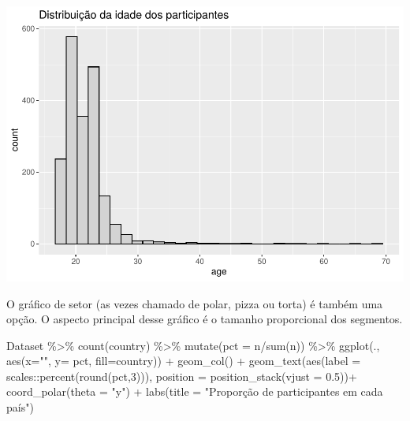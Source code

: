 \documentclass[
]{book}
\newenvironment{Shaded}{\begin{snugshade}}{\end{snugshade}}
\newcommand{\AttributeTok}[1]{\textcolor[rgb]{0.77,0.63,0.00}{#1}}
\newcommand{\DecValTok}[1]{\textcolor[rgb]{0.00,0.00,0.81}{#1}}
\newcommand{\FloatTok}[1]{\textcolor[rgb]{0.00,0.00,0.81}{#1}}
\newcommand{\FunctionTok}[1]{\textcolor[rgb]{0.00,0.00,0.00}{#1}}
\newcommand{\NormalTok}[1]{#1}
\newcommand{\SpecialCharTok}[1]{\textcolor[rgb]{0.00,0.00,0.00}{#1}}
\newcommand{\StringTok}[1]{\textcolor[rgb]{0.31,0.60,0.02}{#1}}
\begin{document}
\begin{center}\includegraphics{gitbook-demo_files/figure-latex/unnamed-chunk-16-1} \end{center}

O gráfico de setor (as vezes chamado de polar, pizza ou torta) é também uma opção. O aspecto principal desse gráfico é o tamanho proporcional dos segmentos.

\begin{Shaded}
\begin{Highlighting}[]
\NormalTok{Dataset }\SpecialCharTok{\%\textgreater{}\%} 
  \FunctionTok{count}\NormalTok{(country) }\SpecialCharTok{\%\textgreater{}\%} 
  \FunctionTok{mutate}\NormalTok{(}\AttributeTok{pct =}\NormalTok{ n}\SpecialCharTok{/}\FunctionTok{sum}\NormalTok{(n)) }\SpecialCharTok{\%\textgreater{}\%} 
  \FunctionTok{ggplot}\NormalTok{(., }\FunctionTok{aes}\NormalTok{(}\AttributeTok{x=}\StringTok{""}\NormalTok{, }\AttributeTok{y=}\NormalTok{ pct, }\AttributeTok{fill=}\NormalTok{country)) }\SpecialCharTok{+}
  \FunctionTok{geom\_col}\NormalTok{() }\SpecialCharTok{+}
  \FunctionTok{geom\_text}\NormalTok{(}\FunctionTok{aes}\NormalTok{(}\AttributeTok{label =}\NormalTok{ scales}\SpecialCharTok{::}\FunctionTok{percent}\NormalTok{(}\FunctionTok{round}\NormalTok{(pct,}\DecValTok{3}\NormalTok{))), }
            \AttributeTok{position =} \FunctionTok{position\_stack}\NormalTok{(}\AttributeTok{vjust =} \FloatTok{0.5}\NormalTok{))}\SpecialCharTok{+}
  \FunctionTok{coord\_polar}\NormalTok{(}\AttributeTok{theta =} \StringTok{"y"}\NormalTok{) }\SpecialCharTok{+}
  \FunctionTok{labs}\NormalTok{(}\AttributeTok{title =} \StringTok{"Proporção de participantes em cada país"}\NormalTok{)}
\end{Highlighting}
\end{Shaded}
\end{document}
